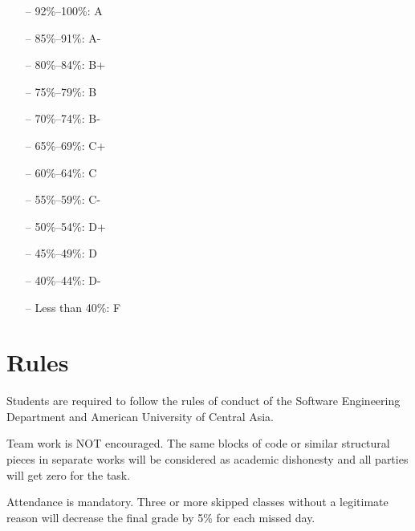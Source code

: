 \documentclass[12pt,a4paper,oneside]{article}
\begin{document}
        \begin{itemize} \itemsep-10pt \parskip0pt 
            \item[--] 92\%--100\%: A\\
            \item[--] 85\%--91\%: A-\\
            \item[--] 80\%--84\%: B+\\
            \item[--] 75\%--79\%: B\\
            \item[--] 70\%--74\%: B-\\
            \item[--] 65\%--69\%: C+\\
            \item[--] 60\%--64\%: C\\
            \item[--] 55\%--59\%: C-\\
            \item[--] 50\%--54\%: D+\\
            \item[--] 45\%--49\%: D\\
            \item[--] 40\%--44\%: D-\\
            \item[--] Less than 40\%: F
        \end{itemize}

    \section{Rules}

        Students are required to follow the rules of conduct of the Software
        Engineering Department and American University of Central Asia.

        Team work is NOT encouraged. The same blocks of code or similar
        structural pieces in separate works will be considered as academic
        dishonesty and all parties will get zero for the task.

        Attendance is mandatory. Three or more skipped classes without a
        legitimate reason will decrease the final grade by 5\% for each missed
        day.
\end{document}
